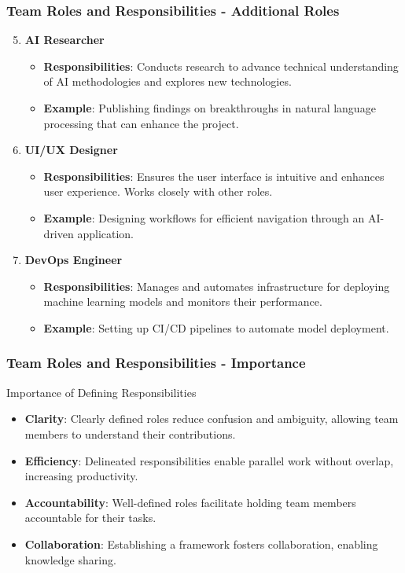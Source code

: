\documentclass{beamer}
\begin{document}
\begin{frame}[fragile]
    \frametitle{Team Roles and Responsibilities - Additional Roles}
    \begin{enumerate}
        \setcounter{enumi}{4}
        \item \textbf{AI Researcher}
            \begin{itemize}
                \item \textbf{Responsibilities}: Conducts research to advance technical understanding of AI methodologies and explores new technologies.
                \item \textbf{Example}: Publishing findings on breakthroughs in natural language processing that can enhance the project.
            \end{itemize}

        \item \textbf{UI/UX Designer}
            \begin{itemize}
                \item \textbf{Responsibilities}: Ensures the user interface is intuitive and enhances user experience. Works closely with other roles.
                \item \textbf{Example}: Designing workflows for efficient navigation through an AI-driven application.
            \end{itemize}

        \item \textbf{DevOps Engineer}
            \begin{itemize}
                \item \textbf{Responsibilities}: Manages and automates infrastructure for deploying machine learning models and monitors their performance.
                \item \textbf{Example}: Setting up CI/CD pipelines to automate model deployment.
            \end{itemize}
    \end{enumerate}
\end{frame}

\begin{frame}[fragile]
    \frametitle{Team Roles and Responsibilities - Importance}
    \begin{block}{Importance of Defining Responsibilities}
        \begin{itemize}
            \item \textbf{Clarity}: Clearly defined roles reduce confusion and ambiguity, allowing team members to understand their contributions.
            \item \textbf{Efficiency}: Delineated responsibilities enable parallel work without overlap, increasing productivity.
            \item \textbf{Accountability}: Well-defined roles facilitate holding team members accountable for their tasks.
            \item \textbf{Collaboration}: Establishing a framework fosters collaboration, enabling knowledge sharing.
        \end{itemize}
    \end{block}
\end{frame}
\end{document}
